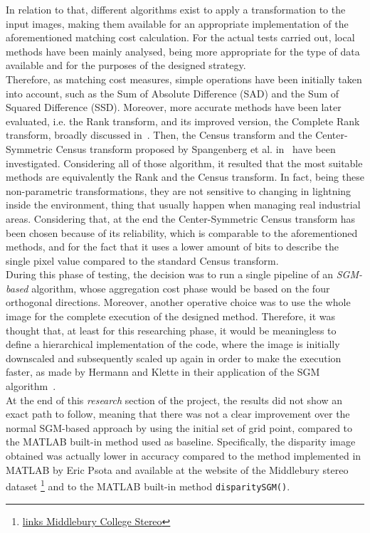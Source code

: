In relation to that, different algorithms exist to apply a transformation to the input images, making them available for an appropriate implementation of the aforementioned matching cost calculation.
For the actual tests carried out, local methods have been mainly analysed, being more appropriate for the type of data available and for the purposes of the designed strategy.\\
Therefore, as matching cost measures, simple operations have been initially taken into account, such as the Sum of Absolute Difference (SAD) and the Sum of Squared Difference (SSD). 
Moreover, more accurate methods have been later evaluated, i.e. the Rank transform, and its improved version, the Complete Rank transform, broadly discussed in~\cite{Demetz2013}.
Then, the Census transform and the Center-Symmetric Census transform proposed by Spangenberg et al. in~\cite{Spangenberg2013} have been investigated.
Considering all of those algorithm, it resulted that the most suitable methods are equivalently the Rank and the Census transform.
In fact, being these non-parametric transformations, they are not sensitive to changing in lightning inside the environment, thing that usually happen when managing real industrial areas. 
Considering that, at the end the Center-Symmetric Census transform has been chosen because of its reliability, which is comparable to the aforementioned methods, and for the fact that it uses a lower amount of bits to describe the single pixel value compared to the standard Census transform.\\
During this phase of testing, the decision was to run a single pipeline of an \textit{SGM-based} algorithm, whose aggregation cost phase would be based on the four orthogonal directions. 
Moreover, another operative choice was to use the whole image for the complete execution of the designed method.
Therefore, it was thought that, at least for this researching phase, it would be meaningless to define a hierarchical implementation of the code, where the image is initially downscaled and subsequently scaled up again in order to make the execution faster, as made by Hermann and Klette in their application of the SGM algorithm~\cite{Hermann2013}.\\
At the end of this \textit{research} section of the project, the results did not show an exact path to follow, meaning that there was not a clear improvement over the normal SGM-based approach by using the initial set of grid point, compared to the MATLAB built-in method used as baseline. 
Specifically, the disparity image obtained was actually lower in accuracy compared to the method implemented in MATLAB by Eric Psota and available at the website of the Middlebury stereo dataset \footnote{\href{http://vision.middlebury.edu/stereo/submit3}{links Middlebury College Stereo}} and to the MATLAB built-in method \texttt{disparitySGM()}. 
